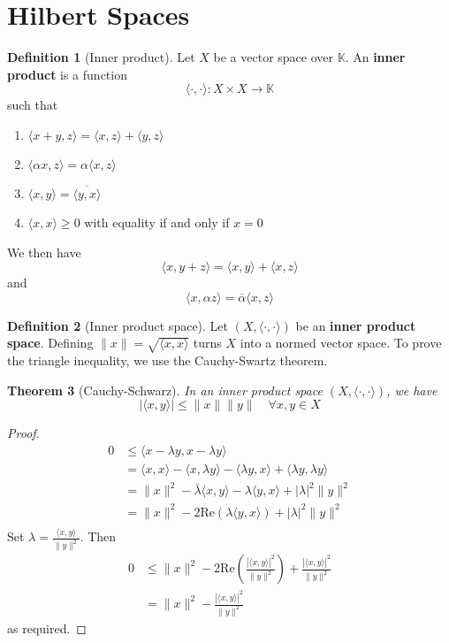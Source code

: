 \documentclass[10pt, oneside, reqno]{amsbook}
\theoremstyle{plain}%
\newtheorem{thm}{Theorem}[section]
\theoremstyle{definition}
\newtheorem{defn}[thm]{Definition}
\theoremstyle{remark}
\newcommand{\K}{\mathbb{K}}
\renewcommand{\Re}{\text{Re}}
\begin{document}
\section{Hilbert Spaces}

\begin{defn}[Inner product]
    Let $X$ be a vector space over $\K$.  
    An \textbf{inner product} is a function \[
    \langle \cdot, \cdot \rangle : X \times X \rightarrow \K 
    \] such that 
    \begin{enumerate}[(1)]
        \item $\langle x + y, z \rangle = \langle x, z \rangle + \langle y, z \rangle$
        \item $\langle \alpha x, z \rangle = \alpha \langle x, z \rangle$
        \item $\langle x, y \rangle = \overline{ \langle y, x \rangle}$
        \item $\langle x, x \rangle \geq 0$ with equality if and only if $x = 0$
    \end{enumerate}
    We then have \[
        \langle x, y + z \rangle = \langle x, y \rangle + \langle x, z \rangle
    \] and \[
        \langle x, \alpha z \rangle = \overline \alpha \langle x, z \rangle
    \]
\end{defn}

\begin{defn}[Inner product space]
    Let $(X, \langle \cdot, \cdot \rangle)$ be an \textbf{inner product space}.  Defining $\| x \| = \sqrt{ \langle x, x \rangle}$ turns $X$ into a normed vector space.  To prove the triangle inequality, we use the Cauchy-Swartz theorem.
\end{defn}

\begin{thm}[Cauchy-Schwarz]
    In an inner product space $(X, \langle \cdot, \cdot \rangle)$, we have \[
        | \langle x, y \rangle | \leq \|x \| \| y \| \quad \forall x, y  \in X
    \] 
\end{thm}
\begin{proof}
    \begin{align*}
        0   &\leq \langle x - \lambda y, x - \lambda y \rangle \\
            &= \langle x, x \rangle - \langle x, \lambda y \rangle - \langle \lambda y, x \rangle +\langle \lambda y, \lambda y \rangle  \\
            &= \| x \|^2 - \bar \lambda \langle x, y \rangle - \lambda \langle y, x \rangle + |\lambda|^2 \| y \|^2 \\
            &= \| x \|^2 - 2 \Re ( \lambda \langle y, x \rangle ) + |\lambda|^2 \| y \|^2 \\
    \end{align*}  Set $\lambda = \frac{\langle x, y \rangle}{\| y \|^2}$.  Then
    \begin{align*}
        0 &\leq \| x \|^2 - 2 \Re ( \frac{|\langle x, y \rangle|^2}{\| y \|^2} ) + \frac{|\langle x, y \rangle|^2}{\| y \|^2} \\
            &= \| x \|^2 - \frac{|\langle x, y \rangle|^2}{\| y \|^2}
    \end{align*} as required.
\end{proof}
\end{document}
